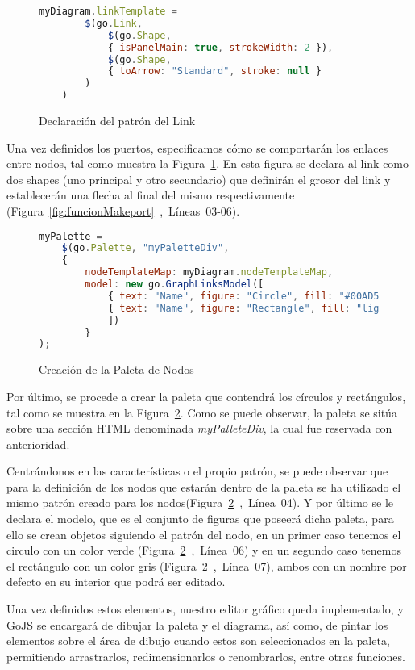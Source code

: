 \begin{figure}[!tb]
	\centering
	\begin{lstlisting}[language=JavaScript]
	myDiagram.linkTemplate =
		$(go.Link, 
			$(go.Shape,  
			{ isPanelMain: true, strokeWidth: 2 }),
			$(go.Shape,  
			{ toArrow: "Standard", stroke: null }
		)
	)
	\end{lstlisting}
\caption{Declaración del patrón del Link}
\label{fig:patronlink}
\end{figure}

Una vez definidos los puertos, especificamos cómo se comportarán los enlaces entre nodos, tal como muestra la Figura~\ref{fig:patronlink}. En esta figura se declara al link como dos shapes (uno principal y otro secundario) que definirán el grosor del link y establecerán una flecha al final del mismo respectivamente (Figura~\ref{fig:funcionMakeport}~,~Líneas~03-06).


\begin{figure}[!tb]
	\centering
\begin{lstlisting}[language=JavaScript]
myPalette =
	$(go.Palette, "myPaletteDiv",  
	{
		nodeTemplateMap: myDiagram.nodeTemplateMap,  
		model: new go.GraphLinksModel([  
			{ text: "Name", figure: "Circle", fill: "#00AD5F" },
			{ text: "Name", figure: "Rectangle", fill: "lightgray" }
			])
		}
);
\end{lstlisting}
\caption{Creación de la Paleta de Nodos}
\label{fig:paletaNodos}
\end{figure}

Por último, se procede a crear la paleta que contendrá los círculos y rectángulos, tal como se muestra en la Figura~\ref{fig:paletaNodos}. Como se puede observar, la paleta se sitúa sobre una sección HTML denominada \emph{myPalleteDiv}, la cual fue reservada con anterioridad. 

Centrándonos en las características o el propio patrón, se puede observar que para la definición de los nodos que estarán dentro de la paleta se ha utilizado el mismo patrón creado para los nodos(Figura~\ref{fig:paletaNodos}~,~Línea~04). Y por último se le declara el modelo, que es el conjunto de figuras que poseerá dicha paleta, para ello se crean objetos siguiendo el patrón del nodo, en un primer caso tenemos el circulo con un color verde (Figura~\ref{fig:paletaNodos}~,~Línea~06) y en un segundo caso tenemos el rectángulo con un color gris (Figura~\ref{fig:paletaNodos}~,~Línea~07), ambos con un nombre por defecto en su interior que podrá ser editado.


Una vez definidos estos elementos, nuestro editor gráfico queda implementado, y GoJS se encargará de dibujar la paleta y el diagrama, así como, de pintar los elementos sobre el área de dibujo cuando estos son seleccionados en la paleta, permitiendo arrastrarlos, redimensionarlos o renombrarlos, entre otras funciones. 
